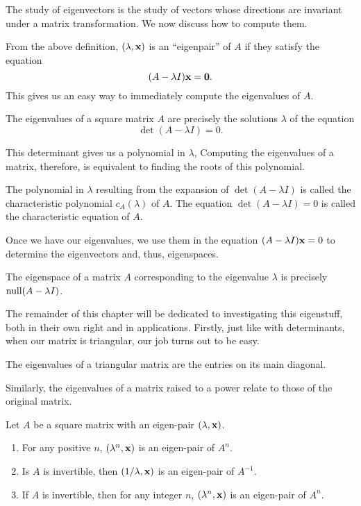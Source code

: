 \documentclass[../m073main.tex]{subfiles}
\begin{document}
The study of eigenvectors is the study of vectors whose directions are invariant under a matrix transformation.
We now discuss how to compute them.

From the above definition, $(\lambda, \mathbf{x})$ is an ``eigenpair'' of $A$ if they satisfy the equation
\[ (A - \lambda I) \mathbf{x} = \mathbf{0}. \]
This gives us an easy way to immediately compute the eigenvalues of $A$.

\begin{theorem}
	The eigenvalues of a square matrix $A$ are precisely the solutions $\lambda$ of the equation
	\[ \det (A - \lambda I) = 0. \]
\end{theorem}

This determinant gives us a polynomial in $\lambda$,
Computing the eigenvalues of a matrix, therefore, is equivalent to finding the roots of this polynomial.

\begin{definition}
	The polynomial in $\lambda$ resulting from the expansion of $\det (A - \lambda I)$ is called the characteristic polynomial $c_A (\lambda)$ of $A$.
	The equation $\det (A - \lambda I) = 0$ is called the characteristic equation of $A$.
\end{definition}

Once we have our eigenvalues, we use them in the equation $(A - \lambda I) \mathbf{x} = 0$ to determine the eigenvectors and, thus, eigenspaces.

\begin{theorem}
	The eigenspace of a matrix $A$ corresponding to the eigenvalue $\lambda$ is precisely $\textrm{null} (A - \lambda I)$.
\end{theorem}

The remainder of this chapter will be dedicated to investigating this eigenstuff, both in their own right and in applications.
Firstly, just like with determinants, when our matrix is triangular, our job turns out to be easy.

\begin{theorem}
	The eigenvalues of a triangular matrix are the entries on its main diagonal.
\end{theorem}

Similarly, the eigenvalues of a matrix raised to a power relate to those of the original matrix.

\pagebreak

\begin{theorem}
	Let $A$ be a square matrix with an eigen-pair $(\lambda, \mathbf{x})$.
	\begin{enumerate}[label=(\alph*)]
		\item For any positive $n$, $(\lambda^n, \mathbf{x})$ is an eigen-pair of $A^n$.
		\item Is $A$ is invertible, then $(1/\lambda, \mathbf{x})$ is an eigen-pair of $A^{-1}$.
		\item If $A$ is invertible, then for any integer $n$, $(\lambda^n, \mathbf{x})$ is an eigen-pair of $A^n$.
	\end{enumerate}
\end{theorem}
\end{document}

